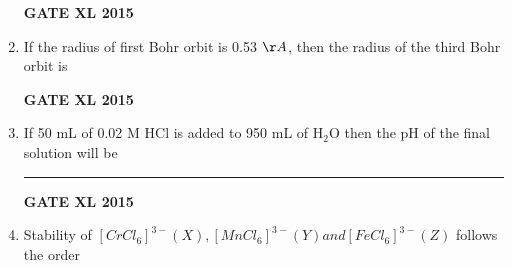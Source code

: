 \documentclass[journal,12pt,onecolumn]{IEEEtran}
\begin{document}
\begin{enumerate}
\begin{enumerate}
\begin{figure}[h!]
		    \caption*{}
		\label{fig:Q15d}
	\end{figure}
    \end{enumerate}
\hfill{\textbf{GATE XL 2015}}
\item If the radius of first Bohr orbit is 0.53 $\AA$, then the radius of the third Bohr orbit is
    \begin{enumerate}
    \end{enumerate}
\hfill{\textbf{GATE XL 2015}}
\item If 50 mL of 0.02 M HCl is added to 950 mL of H$_2$O then the pH of the final solution will be \rule{1cm}{0.15mm}
\hfill{\textbf{GATE XL 2015}}
\item Stability of $[CrCl_6 ]^{3-} (X), [MnCl_6 ]^{3-} (Y) and [FeCl_6 ]^{3-} (Z)$ follows the order


\end{enumerate}
\end{document}
